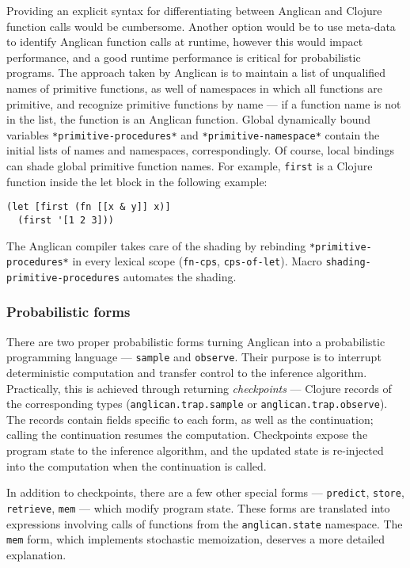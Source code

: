 \documentclass[preprint]{sigplanconf}
\begin{document}
Providing an explicit syntax for differentiating between
Anglican and Clojure function calls would be cumbersome. Another
option would be to use meta-data to identify Anglican function
calls at runtime, however this would impact performance, and
a good runtime performance is critical for probabilistic
programs. The approach taken by Anglican is to maintain a list
of unqualified names of primitive functions, as well of
namespaces in which all functions are primitive, and recognize
primitive functions by name --- if a function name is not in the
list, the function is an Anglican function. Global dynamically
bound variables \texttt{*primitive-procedures*} and
\texttt{*primitive-namespace*} contain the initial lists of
names and namespaces, correspondingly. Of course, local bindings
can shade global primitive function names. For example,
\texttt{first} is a Clojure function inside the let block in the
following example:
\begin{lstlisting}[style=default]
(let [first (fn [[x & y]] x)]
  (first '[1 2 3]))
\end{lstlisting}
The Anglican compiler takes care of the shading by rebinding
\texttt{*primitive-procedures*} in every lexical scope
(\texttt{fn-cps}, \texttt{cps-of-let}). Macro
\texttt{shading-primitive-procedures} automates the shading.

\subsubsection{Probabilistic forms}

There are two proper probabilistic forms turning Anglican into a
probabilistic programming language --- \texttt{sample} and
\texttt{observe}. Their purpose is to interrupt deterministic
computation and transfer control to the inference algorithm.
Practically, this is achieved through returning
\textit{checkpoints} --- Clojure records of the corresponding
types (\texttt{anglican.trap.sample} or
\texttt{anglican.trap.observe}). The records contain fields
specific to each form, as well as the continuation; calling the
continuation resumes the computation. Checkpoints expose the
program state to the inference algorithm, and the updated state
is re-injected into the computation when the continuation is
called. 

In addition to checkpoints, there are a few other special forms
--- \texttt{predict}, \texttt{store}, \texttt{retrieve},
\texttt{mem} --- which modify program state. These forms are
translated into expressions involving calls of functions from the
\texttt{anglican.state} namespace. The \texttt{mem} form, which
implements stochastic memoization, deserves a more detailed
explanation.
\end{document}
